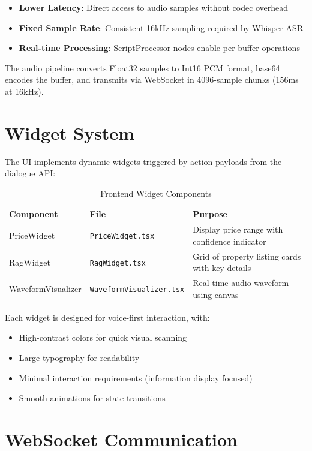 \begin{itemize}
    \item \textbf{Lower Latency}: Direct access to audio samples without codec overhead
    \item \textbf{Fixed Sample Rate}: Consistent 16kHz sampling required by Whisper ASR
    \item \textbf{Real-time Processing}: ScriptProcessor nodes enable per-buffer operations
\end{itemize}

The audio pipeline converts Float32 samples to Int16 PCM format, base64 encodes the buffer, and transmits via WebSocket in 4096-sample chunks (156ms at 16kHz).

\section{Widget System}

The UI implements dynamic widgets triggered by action payloads from the dialogue API:

\begin{table}[!htbp]
\centering
\caption{Frontend Widget Components}
\label{tab:widgets}
\begin{tabular}{|l|l|p{6cm}|}
\hline
\textbf{Component} & \textbf{File} & \textbf{Purpose} \\ \hline
PriceWidget & \texttt{PriceWidget.tsx} & Display price range with confidence indicator \\ \hline
RagWidget & \texttt{RagWidget.tsx} & Grid of property listing cards with key details \\ \hline
WaveformVisualizer & \texttt{WaveformVisualizer.tsx} & Real-time audio waveform using canvas \\ \hline
\end{tabular}
\end{table}

Each widget is designed for voice-first interaction, with:
\begin{itemize}
    \item High-contrast colors for quick visual scanning
    \item Large typography for readability
    \item Minimal interaction requirements (information display focused)
    \item Smooth animations for state transitions
\end{itemize}

\section{WebSocket Communication}

